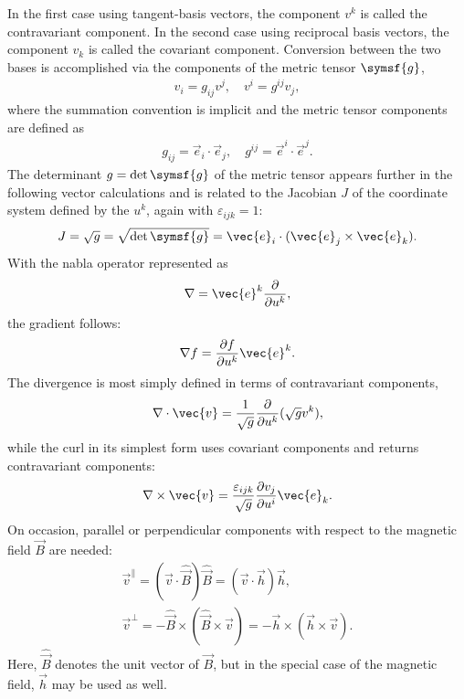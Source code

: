In the first case using tangent-basis vectors, the component $v^{k}$ is called the contravariant component. In the second case using reciprocal basis vectors, the component $v_{k}$ is called the covariant component. Conversion between the two bases is accomplished via the components of the metric tensor $\symsf{g}$,
\begin{gather}
  v_{i} = g_{ij} v^{j}, \quad v^{i} = g^{ij} v_{j},
\end{gather}
where the summation convention is implicit and the metric tensor components are defined as
\begin{gather}
  g_{ij} = \vec{e}_{i} \cdot \vec{e}_{j}, \quad g^{ij} = \vec{e}^{i} \cdot \vec{e}^{j}.
\end{gather}
The determinant $g = \det \symsf{g}$ of the metric tensor appears further in the following vector calculations and is related to the Jacobian $J$ of the coordinate system defined by the $u^{k}$, again with $\varepsilon_{ijk} = 1$:
\begin{gather}
  J = \sqrt{g} = \sqrt{\det \symsf{g}} = \vec{e}_{i} \cdot (\vec{e}_{j} \times \vec{e}_{k}).
\end{gather}
With the nabla operator represented as
\begin{gather}
  \nabla = \vec{e}^{k} \pd{u^{k}},
\end{gather}
the gradient follows:
\begin{gather}
  \grad f = \pd[f]{u^{k}} \vec{e}^{k}.
\end{gather}
The divergence is most simply defined in terms of contravariant components,
\begin{gather}
  \divg \vec{v} = \frac{1}{\sqrt{g}} \pd{u^{k}} (\sqrt{g} v^{k}),
\end{gather}
while the curl in its simplest form uses covariant components and returns contravariant components:
\begin{gather}
  \curl \vec{v} = \frac{\varepsilon_{ijk}}{\sqrt{g}} \pd[v_{j}]{u^{i}} \vec{e}_{k}.
\end{gather}
On occasion, parallel or perpendicular components with respect to the magnetic field $\vec{B}$ are needed:
\begin{gather}
  \vec{v}^{\parallel} = (\vec{v} \cdot \hat{\vec{B}}) \hat{\vec{B}} = (\vec{v} \cdot \vec{h}) \vec{h}, \\
  \vec{v}^{\perp} = -\hat{\vec{B}} \times (\hat{\vec{B}} \times \vec{v}) = -\vec{h} \times (\vec{h} \times \vec{v}).
\end{gather}
Here, $\hat{\vec{B}}$ denotes the unit vector of $\vec{B}$, but in the special case of the magnetic field, $\vec{h}$ may be used as well.

